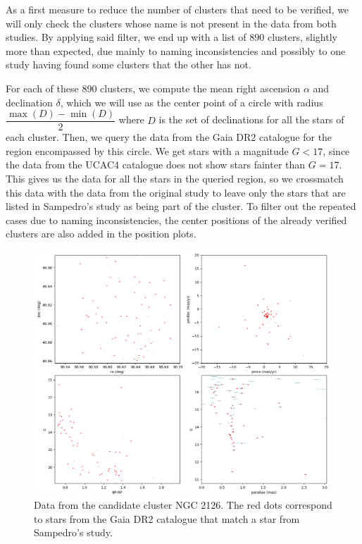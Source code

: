 \documentclass[twocolumn]{revtex4}
\begin{document}
As a first measure to reduce the number of clusters that need to be verified, we will only check the clusters whose name is not present in the data from both studies. By applying said filter, we end up with a list of 890 clusters, slightly more than expected, due mainly to naming inconsistencies and possibly to one study having found some clusters that the other has not.

For each of these 890 clusters, we compute the mean right ascension $\alpha$ and declination $\delta$, which we will use as the center point of a circle with radius $\dfrac{\max(D) - \min(D)}{2}$ where $D$ is the set of declinations for all the stars of each cluster. Then, we query the data from the Gaia DR2 catalogue for the region encompassed by this circle. We get stars with a magnitude $G < 17$, since the data from the UCAC4 catalogue does not show stars fainter than $G = 17$. This gives us the data for all the stars in the queried region, so we crossmatch this data with the data from the original study to leave only the stars that are listed in Sampedro's study as being part of the cluster. To filter out the repeated cases due to naming inconsistencies, the center positions of the already verified clusters are also added in the position plots.

\begin{figure}
\centering
\includegraphics[scale=0.5]{NGC_2126_crossmatch}
\caption{Data from the candidate cluster NGC 2126. The red dots correspond to stars from the Gaia DR2 catalogue that match a star from Sampedro's study.}
\label{crossmatched_data}
\end{figure}
\end{document}
